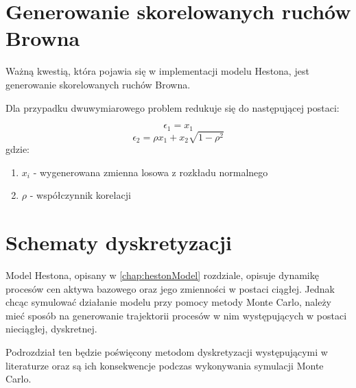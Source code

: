 \documentclass{pracamgr}
\begin{document}
 



\section{Generowanie skorelowanych ruchów Browna}

Ważną kwestią, która pojawia się w implementacji modelu Hestona, jest generowanie skorelowanych 
ruchów Browna.

Dla przypadku dwuwymiarowego problem redukuje się do 
następującej postaci:

\begin{equation}
  \epsilon_1 = x_1
\end{equation}
\begin{equation}
  \epsilon_2 = \rho x_1 + x_2 \sqrt{1-\rho^2}
\end{equation}
gdzie:
\begin{enumerate}
  \item $x_i$ - wygenerowana zmienna losowa z rozkładu normalnego
  \item $\rho$  - współczynnik korelacji
\end{enumerate}




\section{Schematy dyskretyzacji}


Model Hestona, opisany w \ref{chap:hestonModel} rozdziale, opisuje dynamikę procesów cen aktywa 
bazowego oraz jego zmienności w postaci ciągłej.
Jednak chcąc symulować działanie modelu przy pomocy metody Monte Carlo, należy mieć sposób na generowanie trajektorii procesów w nim występujących w postaci nieciągłej, dyskretnej. 

Podrozdział ten będzie poświęcony metodom dyskretyzacji występującymi w literaturze oraz są ich konsekwencje podczas wykonywania symulacji Monte Carlo.
\end{document}
